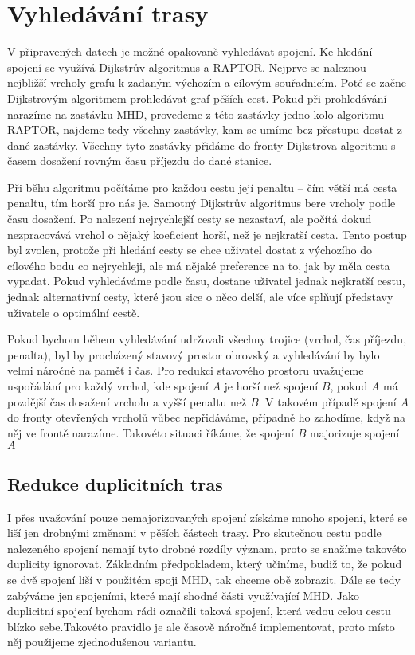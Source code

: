 \chapter{Vyhledávání trasy}
V připravených datech je možné opakovaně vyhledávat spojení. Ke hledání spojení
se využívá Dijkstrův algoritmus a RAPTOR. Nejprve se naleznou nejbližší vrcholy
grafu k zadaným výchozím a cílovým souřadnicím. Poté se začne Dijkstrovým
algoritmem prohledávat graf pěších cest. Pokud při prohledávání narazíme na
zastávku MHD, provedeme z této zastávky jedno kolo algoritmu RAPTOR, najdeme
tedy všechny zastávky, kam se umíme bez přestupu dostat z dané zastávky. Všechny
tyto zastávky přidáme do fronty Dijkstrova algoritmu s časem dosažení rovným
času příjezdu do dané stanice. 

Při běhu algoritmu počítáme pro každou cestu její penaltu -- čím větší má
cesta penaltu, tím horší pro nás je. Samotný Dijkstrův algoritmus bere vrcholy
podle času dosažení. Po nalezení nejrychlejší cesty se nezastaví, ale počítá
dokud nezpracovává vrchol o nějaký koeficient horší, než je nejkratší cesta. 
Tento postup byl zvolen, protože při hledání cesty se chce uživatel dostat z výchozího
do cílového bodu co nejrychleji, ale má nějaké preference na to, jak by měla
cesta vypadat. Pokud vyhledáváme podle času, dostane uživatel jednak nejkratší
cestu, jednak alternativní cesty, které jsou sice o něco delší, ale více splňují
představy uživatele o optimální cestě.

Pokud bychom během vyhledávání udržovali všechny trojice (vrchol, čas příjezdu,
penalta), byl by procházený stavový prostor obrovský a vyhledávání by bylo velmi
náročné na paměť i čas. Pro redukci stavového prostoru uvažujeme uspořádání pro
každý vrchol, kde spojení $A$ je horší než spojení $B$, pokud $A$ má pozdější
čas dosažení vrcholu a vyšší penaltu než $B$. V takovém případě spojení $A$ do
fronty otevřených vrcholů vůbec nepřidáváme, případně ho zahodíme, když na něj
ve frontě narazíme. Takovéto situaci říkáme, že spojení $B$ majorizuje spojení~$A$

\section{Redukce duplicitních tras}
I přes uvažování pouze nemajorizovaných spojení získáme mnoho spojení, které se
liší jen drobnými změnami v pěších částech trasy. Pro skutečnou cestu podle
nalezeného spojení nemají tyto drobné rozdíly význam, proto se snažíme takovéto
duplicity ignorovat. Základním předpokladem, který učiníme, budiž to, že pokud
se dvě spojení liší v použitém spoji MHD, tak chceme obě zobrazit. Dále se tedy
zabýváme jen spojeními, které mají shodné části využívající MHD. Jako duplicitní
spojení bychom rádi označili taková spojení, která vedou celou cestu blízko
sebe.Takovéto pravidlo je ale časově náročné implementovat, proto místo něj použijeme
zjednodušenou variantu.

